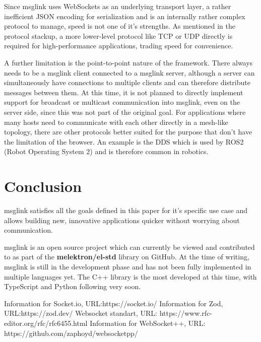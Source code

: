 \documentclass[conference]{IEEEtran}
\begin{document}
Since msglink uses WebSockets as an underlying transport layer, a rather inefficient JSON encoding for serialization and is an internally rather complex protocol to manage, speed is not one of it's strengths. As mentioned in the protocol stackup, a more lower-level protocol like TCP or UDP directly is required for high-performance applications, trading speed for convenience.

A further limitation is the point-to-point nature of the framework. There always needs to be a msglink client connected to a msglink server, although a server can simultaneously have connections to multiple clients and can therefore distribute messages between them. At this time, it is not planned to directly implement support for broadcast or multicast communication into msglink, even on the server side, since this was not part of the original goal. For applications where many hosts need to communicate with each other directly in a mesh-like topology, there are other protocols better suited for the purpose that don't have the limitation of the browser. An example is the DDS which is used by ROS2 (Robot Operating System 2) and is therefore common in robotics.


\section{Conclusion}

msglink satisfies all the goals defined in this paper for it's specific use case and allows building new, innovative applications quicker without worrying about communication.

msglink is an open source project which can currently be viewed and contributed to as part of the \textbf{melektron/el-std} library on GitHub. At the time of writing, msglink is still in the development phase and has not been fully implemented in multiple languages yet. The C++ library is the most developed at this time, with TypeScript and Python following very soon.




\listoffigures

\begin{thebibliography}{00}

     Information for Socket.io, URL:https://socket.io/
     Information for Zod, URL:https://zod.dev/
     Websocket standart, URL:  https://www.rfc-editor.org/rfc/rfc6455.html
     Information for WebSocket++, URL: https://github.com/zaphoyd/websocketpp/
    
\end{thebibliography}
\end{document}
